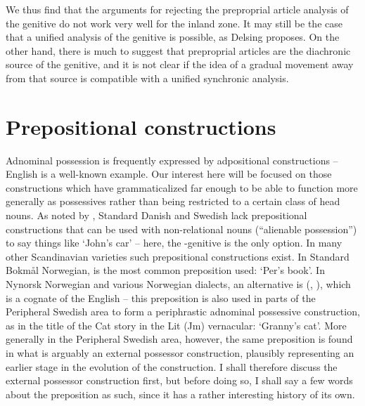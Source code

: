 
We thus find that the arguments for rejecting the preproprial article analysis of the genitive do not work very well for the inland zone. It may still be the case that a unified analysis of the genitive is possible, as Delsing proposes. On the other hand, there is much to suggest that preproprial articles are the diachronic source of the genitive, and it is not clear if the idea of a gradual movement away from that source is compatible with a unified synchronic analysis. 


\section{\rmfamily Prepositional constructions}
\label{bkm:Ref136433022}
Adnominal possession is frequently expressed by adpositional constructions – English is a well-known example. Our interest here will be focused on those constructions which have grammaticalized far enough to be able to function more generally as possessives rather than being restricted to a certain class of head nouns. As noted by \citet[43]{Delsing2003a}, Standard Danish and Swedish lack prepositional constructions that can be used with non-relational nouns (“alienable possession”) to say things like ‘John’s car’ – here, the -genitive is the only option. In many other Scandinavian varieties such prepositional constructions exist. In Standard Bokmål Norwegian,  is the most common preposition used:  ‘Per’s book’. In Nynorsk Norwegian and various Norwegian dialects, an alternative is (\citet[263]{FaarlundEtAl1997}, \citet[43]{Delsing2003a}), which is a cognate of the English  – this preposition is also used in parts of the Peripheral Swedish area to form a periphrastic adnominal possessive construction, as in the title of the Cat story in the Lit (Jm) vernacular: ‘Granny’s cat’. More generally in the Peripheral Swedish area, however, the same preposition is found in what is arguably an external possessor construction, plausibly representing an earlier stage in the evolution of the construction. I shall therefore discuss the external possessor construction first, but before doing so, I shall say a few words about the preposition as such, since it has a rather interesting history of its own. 

